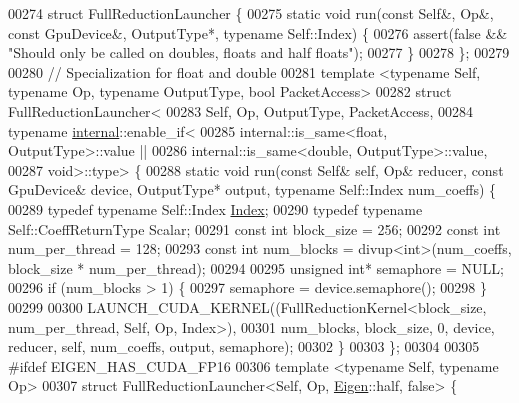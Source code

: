 \begin{DoxyCode}
00274 \textcolor{keyword}{struct }FullReductionLauncher \{
00275   \textcolor{keyword}{static} \textcolor{keywordtype}{void} run(\textcolor{keyword}{const} Self&, Op&, \textcolor{keyword}{const} GpuDevice&, OutputType*, \textcolor{keyword}{typename} Self::Index) \{
00276     assert(\textcolor{keyword}{false} && \textcolor{stringliteral}{"Should only be called on doubles, floats and half floats"});
00277   \}
00278 \};
00279 
00280 \textcolor{comment}{// Specialization for float and double}
00281 \textcolor{keyword}{template} <\textcolor{keyword}{typename} Self, \textcolor{keyword}{typename} Op, \textcolor{keyword}{typename} OutputType, \textcolor{keywordtype}{bool} PacketAccess>
00282 \textcolor{keyword}{struct }FullReductionLauncher<
00283     Self, Op, OutputType, PacketAccess,
00284     typename \hyperlink{namespaceinternal}{internal}::enable\_if<
00285       internal::is\_same<float, OutputType>::value ||
00286       internal::is\_same<double, OutputType>::value,
00287     void>::type> \{
00288   \textcolor{keyword}{static} \textcolor{keywordtype}{void} run(\textcolor{keyword}{const} Self& \textcolor{keyword}{self}, Op& reducer, \textcolor{keyword}{const} GpuDevice& device, OutputType* output, \textcolor{keyword}{typename} 
      Self::Index num\_coeffs) \{
00289     \textcolor{keyword}{typedef} \textcolor{keyword}{typename} Self::Index \hyperlink{namespace_eigen_a62e77e0933482dafde8fe197d9a2cfde}{Index};
00290     \textcolor{keyword}{typedef} \textcolor{keyword}{typename} Self::CoeffReturnType Scalar;
00291     \textcolor{keyword}{const} \textcolor{keywordtype}{int} block\_size = 256;
00292     \textcolor{keyword}{const} \textcolor{keywordtype}{int} num\_per\_thread = 128;
00293     \textcolor{keyword}{const} \textcolor{keywordtype}{int} num\_blocks = divup<int>(num\_coeffs, block\_size * num\_per\_thread);
00294 
00295     \textcolor{keywordtype}{unsigned} \textcolor{keywordtype}{int}* semaphore = NULL;
00296     \textcolor{keywordflow}{if} (num\_blocks > 1) \{
00297       semaphore = device.semaphore();
00298     \}
00299 
00300     LAUNCH\_CUDA\_KERNEL((FullReductionKernel<block\_size, num\_per\_thread, Self, Op, Index>),
00301                        num\_blocks, block\_size, 0, device, reducer, \textcolor{keyword}{self}, num\_coeffs, output, semaphore);
00302   \}
00303 \};
00304 
00305 \textcolor{preprocessor}{#ifdef EIGEN\_HAS\_CUDA\_FP16}
00306 \textcolor{keyword}{template} <\textcolor{keyword}{typename} Self, \textcolor{keyword}{typename} Op>
00307 \textcolor{keyword}{struct }FullReductionLauncher<Self, Op, \hyperlink{namespace_eigen}{Eigen}::half, false> \{

\end{DoxyCode}
